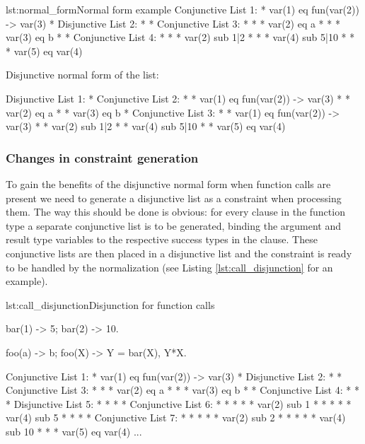 \begin{console}{lst:normal_form}{Normal form example}
Conjunctive List 1:
 * var(1) eq fun(var(2)) -> var(3)
 * Disjunctive List 2:
 *  * Conjunctive List 3:
 *  *  * var(2) eq a
 *  *  * var(3) eq b
 *  * Conjunctive List 4:
 *  *  * var(2) sub 1|2
 *  *  * var(4) sub 5|10
 *  *  * var(5) eq var(4)

Disjunctive normal form of the list:

Disjunctive List 1:
 * Conjunctive List 2:
 *  *  var(1) eq fun(var(2)) -> var(3)
 *  *  var(2) eq a
 *  *  var(3) eq b
 *  Conjunctive List 3:
 *  *  var(1) eq fun(var(2)) -> var(3)
 *  *  var(2) sub 1|2
 *  *  var(4) sub 5|10
 *  *  var(5) eq var(4)
\end{console}

\subsubsection{Changes in constraint generation}
\label{sct:intersect_constr_generation}

To gain the benefits of the disjunctive normal form when function
calls are present we need to generate a disjunctive list as a
constraint when processing them. The way this should be done is
obvious: for every clause in the function type a separate conjunctive
list is to be generated, binding the argument and result type
variables to the respective success types in the clause. These
conjunctive lists are then placed in a disjunctive list and the
constraint is ready to be handled by the normalization (see Listing
\ref{lst:call_disjunction} for an example).

\begin{console}{lst:call_disjunction}{Disjunction for function calls}

bar(1) -> 5;
bar(2) -> 10.

foo(a) -> b;
foo(X) ->
  Y = bar(X),
  Y*X.


Conjunctive List 1:
 * var(1) eq fun(var(2)) -> var(3)
 * Disjunctive List 2:
 *  * Conjunctive List 3:
 *  *  * var(2) eq a
 *  *  * var(3) eq b
 *  * Conjunctive List 4:
 *  *  * Disjunctive List 5:
 *  *  *  *  Conjunctive List 6:
 *  *  *  *  *  var(2) sub 1
 *  *  *  *  *  var(4) sub 5
 *  *  *  *  Conjunctive List 7:
 *  *  *  *  *  var(2) sub 2
 *  *  *  *  *  var(4) sub 10
 *  *  * var(5) eq var(4)
 ...
\end{console}


